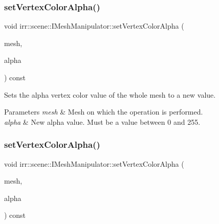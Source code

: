 \subsubsection{\texorpdfstring{set\+Vertex\+Color\+Alpha()}{setVertexColorAlpha()}\hspace{0.1cm}{\footnotesize\ttfamily [1/4]}}
{\footnotesize\ttfamily void irr\+::scene\+::\+I\+Mesh\+Manipulator\+::set\+Vertex\+Color\+Alpha (\begin{DoxyParamCaption}\item[{\hyperlink{classirr_1_1scene_1_1IMesh}{I\+Mesh} $\ast$}]{mesh,  }\item[{\hyperlink{namespaceirr_ac66849b7a6ed16e30ebede579f9b47c6}{s32}}]{alpha }\end{DoxyParamCaption}) const\hspace{0.3cm}{\ttfamily [inline]}}



Sets the alpha vertex color value of the whole mesh to a new value. 


\begin{DoxyParams}{Parameters}
{\em mesh} & Mesh on which the operation is performed. \\
\hline
{\em alpha} & New alpha value. Must be a value between 0 and 255. \\
\hline
\end{DoxyParams}
\mbox{\label{classirr_1_1scene_1_1IMeshManipulator_a96391fbe81aaddf8afa56b5b13da66e2}} 
\subsubsection{\texorpdfstring{set\+Vertex\+Color\+Alpha()}{setVertexColorAlpha()}\hspace{0.1cm}{\footnotesize\ttfamily [2/4]}}
{\footnotesize\ttfamily void irr\+::scene\+::\+I\+Mesh\+Manipulator\+::set\+Vertex\+Color\+Alpha (\begin{DoxyParamCaption}\item[{\hyperlink{classirr_1_1scene_1_1IMesh}{I\+Mesh} $\ast$}]{mesh,  }\item[{\hyperlink{namespaceirr_ac66849b7a6ed16e30ebede579f9b47c6}{s32}}]{alpha }\end{DoxyParamCaption}) const\hspace{0.3cm}{\ttfamily [inline]}}




